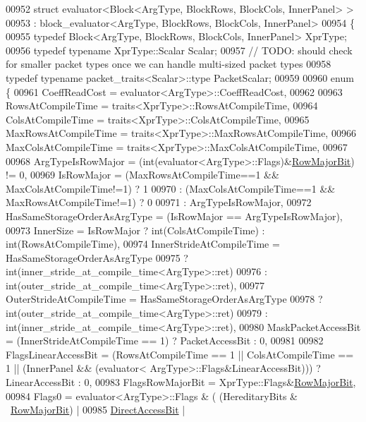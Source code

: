 \begin{DoxyCode}
00952 \textcolor{keyword}{struct }evaluator<Block<ArgType, BlockRows, BlockCols, InnerPanel> >
00953   : block\_evaluator<ArgType, BlockRows, BlockCols, InnerPanel>
00954 \{
00955   \textcolor{keyword}{typedef} Block<ArgType, BlockRows, BlockCols, InnerPanel> XprType;
00956   \textcolor{keyword}{typedef} \textcolor{keyword}{typename} XprType::Scalar Scalar;
00957   \textcolor{comment}{// TODO: should check for smaller packet types once we can handle multi-sized packet types}
00958   \textcolor{keyword}{typedef} \textcolor{keyword}{typename} packet\_traits<Scalar>::type PacketScalar;
00959   
00960   \textcolor{keyword}{enum} \{
00961     CoeffReadCost = evaluator<ArgType>::CoeffReadCost,
00962     
00963     RowsAtCompileTime = traits<XprType>::RowsAtCompileTime,
00964     ColsAtCompileTime = traits<XprType>::ColsAtCompileTime,
00965     MaxRowsAtCompileTime = traits<XprType>::MaxRowsAtCompileTime,
00966     MaxColsAtCompileTime = traits<XprType>::MaxColsAtCompileTime,
00967     
00968     ArgTypeIsRowMajor = (int(evaluator<ArgType>::Flags)&\hyperlink{group__flags_gae4f56c2a60bbe4bd2e44c5b19cbe8762}{RowMajorBit}) != 0,
00969     IsRowMajor = (MaxRowsAtCompileTime==1 && MaxColsAtCompileTime!=1) ? 1
00970                : (MaxColsAtCompileTime==1 && MaxRowsAtCompileTime!=1) ? 0
00971                : ArgTypeIsRowMajor,
00972     HasSameStorageOrderAsArgType = (IsRowMajor == ArgTypeIsRowMajor),
00973     InnerSize = IsRowMajor ? int(ColsAtCompileTime) : int(RowsAtCompileTime),
00974     InnerStrideAtCompileTime = HasSameStorageOrderAsArgType
00975                              ? int(inner\_stride\_at\_compile\_time<ArgType>::ret)
00976                              : int(outer\_stride\_at\_compile\_time<ArgType>::ret),
00977     OuterStrideAtCompileTime = HasSameStorageOrderAsArgType
00978                              ? int(outer\_stride\_at\_compile\_time<ArgType>::ret)
00979                              : int(inner\_stride\_at\_compile\_time<ArgType>::ret),
00980     MaskPacketAccessBit = (InnerStrideAtCompileTime == 1) ? PacketAccessBit : 0,
00981     
00982     FlagsLinearAccessBit = (RowsAtCompileTime == 1 || ColsAtCompileTime == 1 || (InnerPanel && (evaluator<
      ArgType>::Flags&LinearAccessBit))) ? LinearAccessBit : 0,    
00983     FlagsRowMajorBit = XprType::Flags&\hyperlink{group__flags_gae4f56c2a60bbe4bd2e44c5b19cbe8762}{RowMajorBit},
00984     Flags0 = evaluator<ArgType>::Flags & ( (HereditaryBits & ~\hyperlink{group__flags_gae4f56c2a60bbe4bd2e44c5b19cbe8762}{RowMajorBit}) |
00985                                            \hyperlink{group__flags_gabf1e9d0516a933445a4c307ad8f14915}{DirectAccessBit} |

\end{DoxyCode}
